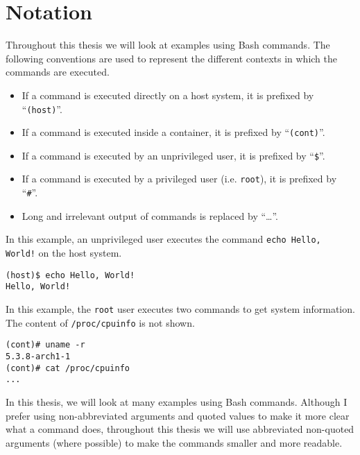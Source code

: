 \chapter{Notation}\label{chapter:notation}
Throughout this thesis we will look at examples using Bash commands. The following conventions are used to represent the different contexts in which the commands are executed.

\begin{itemize}
    \item If a command is executed directly on a host system, it is prefixed by ``\lstinline{(host)}''.
    \item If a command is executed inside a container, it is prefixed by ``\lstinline{(cont)}''.
    \item If a command is executed by an unprivileged user, it is prefixed by ``\lstinline{$}''.
    \item If a command is executed by a privileged user (i.e. \lstinline{root}), it is prefixed by ``\lstinline{#}''.
    \item Long and irrelevant output of commands is replaced by ``\ldots''.
\end{itemize}

In this example, an unprivileged user executes the command \lstinline{echo Hello, World!} on the host system.
\begin{lstlisting}[caption={Shell command notation example 1.}, captionpos=b]
(host)$ echo Hello, World!
Hello, World!
\end{lstlisting}

\hfill

In this example, the \lstinline{root} user executes two commands to get system information. The content of \lstinline{/proc/cpuinfo} is not shown.
\begin{lstlisting}[caption={Shell command notation example 2.}, captionpos=b]
(cont)# uname -r
5.3.8-arch1-1
(cont)# cat /proc/cpuinfo
...
\end{lstlisting}

\hfill

In this thesis, we will look at many examples using Bash commands. Although I prefer using non-abbreviated arguments and quoted values to make it more clear what a command does, throughout this thesis we will use abbreviated non-quoted arguments (where possible) to make the commands smaller and more readable.
